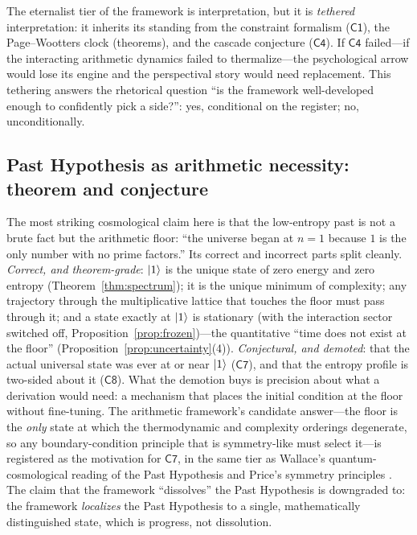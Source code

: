 \begin{remark}
The eternalist tier of the framework is interpretation, but it is \emph{tethered}
interpretation: it inherits its standing from the constraint formalism
($\mathsf{C1}$), the Page--Wootters clock (theorems), and the cascade conjecture
($\mathsf{C4}$). If $\mathsf{C4}$ failed---if the interacting arithmetic dynamics failed to
thermalize---the psychological arrow would lose its engine and the perspectival story would
need replacement. This tethering answers the rhetorical question ``is the
framework well-developed enough to confidently pick a side?'': yes, conditional on the
register; no, unconditionally.
\end{remark}

\subsection{Past Hypothesis as arithmetic necessity: theorem and conjecture}

The most striking cosmological claim here is that the low-entropy past is not a brute
fact but the arithmetic floor: ``the universe began at $n=1$ because $1$ is the only number
with no prime factors.'' Its correct and incorrect parts split cleanly.
\emph{Correct, and theorem-grade}: $\lvert 1\rangle$ is the unique state of zero energy and
zero entropy (Theorem~\ref{thm:spectrum}); it is the unique minimum of complexity; any
trajectory through the multiplicative lattice that touches the floor must pass through it;
and a state exactly at $\lvert 1\rangle$ is stationary (with the interaction sector switched off,
Proposition~\ref{prop:frozen})---the quantitative ``time does not exist at the floor''
(Proposition~\ref{prop:uncertainty}(4)). \emph{Conjectural, and demoted}: that the actual
universal state was ever at or near $\lvert 1\rangle$ ($\mathsf{C7}$), and that the entropy profile
is two-sided about it ($\mathsf{C8}$). What the demotion buys is precision about what a
derivation would need: a mechanism that places the initial condition at the floor without
fine-tuning. The arithmetic framework's candidate answer---the floor is the \emph{only}
state at which the thermodynamic and complexity orderings degenerate, so any
boundary-condition principle that is symmetry-like must select it---is registered as the
motivation for $\mathsf{C7}$, in the same tier as Wallace's quantum-cosmological
reading of the Past Hypothesis \cite{wallace2017} and Price's symmetry principles
\cite{price1996}. The claim that the framework ``dissolves'' the Past Hypothesis
is downgraded to: the framework \emph{localizes} the Past Hypothesis to a single,
mathematically distinguished state, which is progress, not dissolution.

